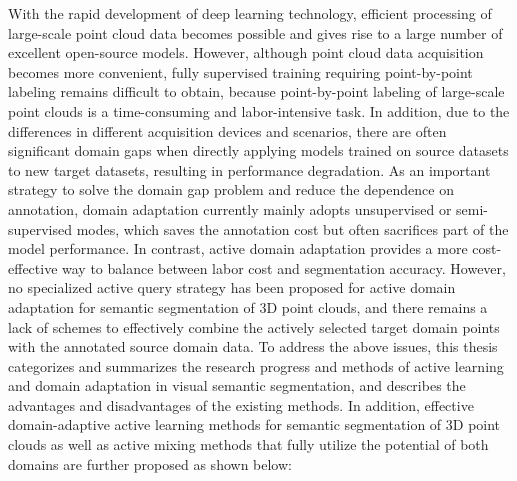With the rapid development of deep learning technology, efficient processing of large-scale point cloud data becomes possible and gives rise to a large number of excellent open-source models.
However, although point cloud data acquisition becomes more convenient, fully supervised training requiring point-by-point labeling remains difficult to obtain, because point-by-point labeling of large-scale point clouds is a time-consuming and labor-intensive task.
In addition, due to the differences in different acquisition devices and scenarios, there are often significant domain gaps when directly applying models trained on source datasets to new target datasets, resulting in performance degradation. As an important strategy to solve the domain gap problem and reduce the dependence on annotation, domain adaptation currently mainly adopts unsupervised or semi-supervised modes, which saves the annotation cost but often sacrifices part of the model performance. In contrast, active domain adaptation provides a more cost-effective way to balance between labor cost and segmentation accuracy. 
However, no specialized active query strategy has been proposed for active domain adaptation for semantic segmentation of 3D point clouds, and there remains a lack of schemes to effectively combine the actively selected target domain points with the annotated source domain data.
To address the above issues, this thesis categorizes and summarizes the research progress and methods of active learning and domain adaptation in visual semantic segmentation, and describes the advantages and disadvantages of the existing methods. In addition, effective domain-adaptive active learning methods for semantic segmentation of 3D point clouds as well as active mixing methods that fully utilize the potential of both domains are further proposed as shown below:

